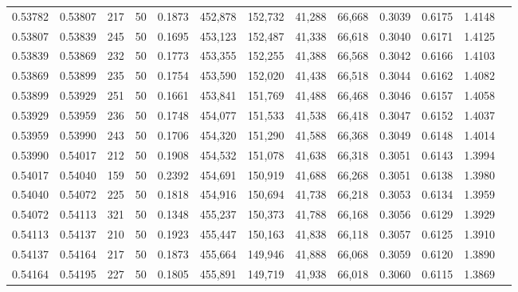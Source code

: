 \begin{tabular}{rrrrrrrrrrrrr}
0.53782 & 0.53807 &   217 &  50 &                                     0.1873 & 452,878 & 152,732 &  41,288 &  66,668 & 0.3039 & 0.6175 & 1.4148 \\
0.53807 & 0.53839 &   245 &  50 &                                     0.1695 & 453,123 & 152,487 &  41,338 &  66,618 & 0.3040 & 0.6171 & 1.4125 \\
0.53839 & 0.53869 &   232 &  50 &                                     0.1773 & 453,355 & 152,255 &  41,388 &  66,568 & 0.3042 & 0.6166 & 1.4103 \\
0.53869 & 0.53899 &   235 &  50 &                                     0.1754 & 453,590 & 152,020 &  41,438 &  66,518 & 0.3044 & 0.6162 & 1.4082 \\
0.53899 & 0.53929 &   251 &  50 &                                     0.1661 & 453,841 & 151,769 &  41,488 &  66,468 & 0.3046 & 0.6157 & 1.4058 \\
0.53929 & 0.53959 &   236 &  50 &                                     0.1748 & 454,077 & 151,533 &  41,538 &  66,418 & 0.3047 & 0.6152 & 1.4037 \\
0.53959 & 0.53990 &   243 &  50 &                                     0.1706 & 454,320 & 151,290 &  41,588 &  66,368 & 0.3049 & 0.6148 & 1.4014 \\
0.53990 & 0.54017 &   212 &  50 &                                     0.1908 & 454,532 & 151,078 &  41,638 &  66,318 & 0.3051 & 0.6143 & 1.3994 \\
0.54017 & 0.54040 &   159 &  50 &                                     0.2392 & 454,691 & 150,919 &  41,688 &  66,268 & 0.3051 & 0.6138 & 1.3980 \\
0.54040 & 0.54072 &   225 &  50 &                                     0.1818 & 454,916 & 150,694 &  41,738 &  66,218 & 0.3053 & 0.6134 & 1.3959 \\
0.54072 & 0.54113 &   321 &  50 &                                     0.1348 & 455,237 & 150,373 &  41,788 &  66,168 & 0.3056 & 0.6129 & 1.3929 \\
0.54113 & 0.54137 &   210 &  50 &                                     0.1923 & 455,447 & 150,163 &  41,838 &  66,118 & 0.3057 & 0.6125 & 1.3910 \\
0.54137 & 0.54164 &   217 &  50 &                                     0.1873 & 455,664 & 149,946 &  41,888 &  66,068 & 0.3059 & 0.6120 & 1.3890 \\
0.54164 & 0.54195 &   227 &  50 &                                     0.1805 & 455,891 & 149,719 &  41,938 &  66,018 & 0.3060 & 0.6115 & 1.3869 \\

\end{tabular}
